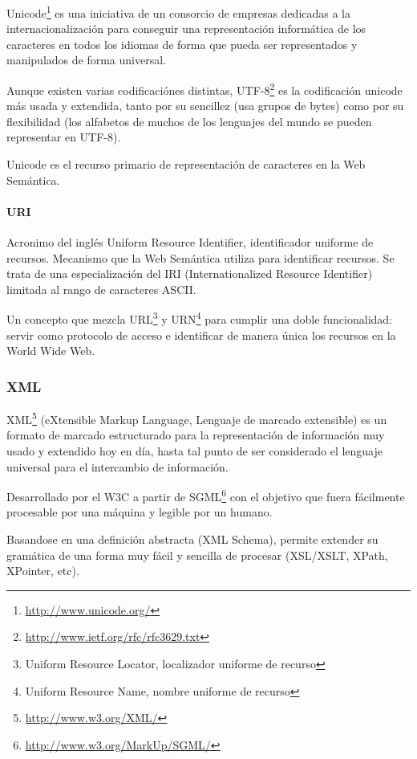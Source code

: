 Unicode\footnote{\url{http://www.unicode.org/}} es una iniciativa de un consorcio de 
empresas dedicadas a la internacionalización para conseguir una representación 
informática de los caracteres en todos los idiomas de forma que pueda ser representados
y manipulados de forma universal. 

Aunque existen varias codificaciónes distintas, 
UTF-8\footnote{\url{http://www.ietf.org/rfc/rfc3629.txt}} es la codificación 
unicode más usada y extendida, tanto por su sencillez (usa grupos de bytes) 
como por su flexibilidad (los alfabetos de muchos de los lenguajes del mundo 
se pueden representar en UTF-8).

Unicode es el recurso primario de representación de caracteres en la Web Semántica.

\paragraph{URI}

Acronimo del inglés Uniform Resource Identifier, identificador uniforme de recursos.
Mecanismo que la Web Semántica utiliza para identificar recursos. Se trata de una
especialización del IRI (Internationalized Resource Identifier) limitada al rango
de caracteres ASCII.

Un concepto que mezcla URL\footnote{Uniform Resource Locator, localizador uniforme de recurso} 
y URN\footnote{Uniform Resource Name, nombre uniforme de recurso} para cumplir una doble 
funcionalidad: servir como protocolo de acceso e identificar de manera única los recursos 
en la World Wide Web.

\subsubsection{XML}

XML\footnote{\url{http://www.w3.org/XML/}} (eXtensible Markup Language, Lenguaje 
de marcado extensible) es un formato de marcado estructurado para la representación 
de información muy usado y extendido hoy en día, hasta tal punto de ser considerado 
el lenguaje universal para el intercambio de información. 

Desarrollado por el W3C a partir de SGML\footnote{\url{http://www.w3.org/MarkUp/SGML/}} 
con el objetivo que fuera fácilmente procesable por una máquina y legible por un 
humano. 

Basandose en una definición abstracta (XML Schema), permite extender su gramática 
de una forma muy fácil y sencilla de procesar (XSL/XSLT, XPath, XPointer, etc).

